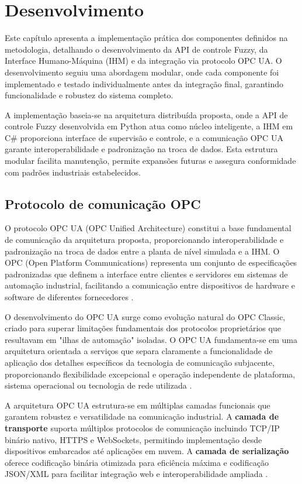 \chapter{Desenvolvimento}
\label{cap:desenvolvimento}

Este capítulo apresenta a implementação prática dos componentes definidos na metodologia, detalhando o desenvolvimento da API de controle Fuzzy, da Interface Humano-Máquina (IHM) e da integração via protocolo OPC UA. O desenvolvimento seguiu uma abordagem modular, onde cada componente foi implementado e testado individualmente antes da integração final, garantindo funcionalidade e robustez do sistema completo.

A implementação baseia-se na arquitetura distribuída proposta, onde a API de controle Fuzzy desenvolvida em Python atua como núcleo inteligente, a IHM em C\# proporciona interface de supervisão e controle, e a comunicação OPC UA garante interoperabilidade e padronização na troca de dados. Esta estrutura modular facilita manutenção, permite expansões futuras e assegura conformidade com padrões industriais estabelecidos.

\section{Protocolo de comunicação OPC}
\label{sec:opc}

O protocolo OPC UA (OPC Unified Architecture) constitui a base fundamental de comunicação da arquitetura proposta, proporcionando interoperabilidade e padronização na troca de dados entre a planta de nível simulada e a IHM. O OPC (Open Platform Communications) representa um conjunto de especificações padronizadas que definem a interface entre clientes e servidores em sistemas de automação industrial, facilitando a comunicação entre dispositivos de hardware e software de diferentes fornecedores \cite{opc2025a}.

O desenvolvimento do OPC UA surge como evolução natural do OPC Classic, criado para superar limitações fundamentais dos protocolos proprietários que resultavam em "ilhas de automação" isoladas. O OPC UA fundamenta-se em uma arquitetura orientada a serviços que separa claramente a funcionalidade de aplicação dos detalhes específicos da tecnologia de comunicação subjacente, proporcionando flexibilidade excepcional e operação independente de plataforma, sistema operacional ou tecnologia de rede utilizada \cite{opc2025b}.

A arquitetura OPC UA estrutura-se em múltiplas camadas funcionais que garantem robustez e versatilidade na comunicação industrial. A \textbf{camada de transporte} suporta múltiplos protocolos de comunicação incluindo TCP/IP binário nativo, HTTPS e WebSockets, permitindo implementação desde dispositivos embarcados até aplicações em nuvem. A \textbf{camada de serialização} oferece codificação binária otimizada para eficiência máxima e codificação JSON/XML para facilitar integração web e interoperabilidade ampliada \cite{opc2025b}.

